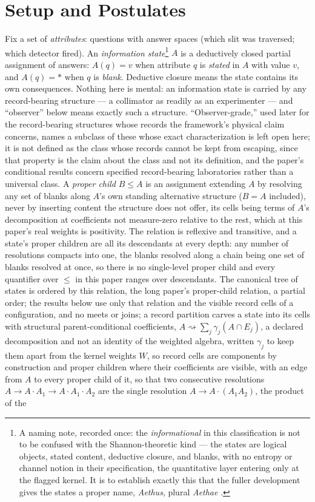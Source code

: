 \section{Setup and Postulates}\label{sec:postulates}

Fix a set of \emph{attributes}: questions with answer spaces (which slit was traversed; which detector fired). An \emph{information state}\footnote{A naming note, recorded once: the \emph{informational} in this classification is not to be confused with the Shannon-theoretic kind --- the states are logical objects, stated content, deductive closure, and blanks, with no entropy or channel notion in their specification, the quantitative layer entering only at the flagged kernel. It is to establish exactly this that the fuller development gives the states a proper name, \emph{Aethus}, plural \emph{Aethae} \cite{Aethus}.} $A$ is a deductively closed partial assignment of answers: $A(q) = v$ when attribute $q$ is \emph{stated} in $A$ with value $v$, and $A(q) = \ast$ when $q$ is \emph{blank}. Deductive closure means the state contains its own consequences. Nothing here is mental: an information state is carried by any record-bearing structure --- a collimator as readily as an experimenter --- and ``observer'' below means exactly such a structure. ``Observer-grade,'' used later for the record-bearing structures whose records the framework's physical claim concerns, names a subclass of these whose exact characterization is left open here; it is not defined as the class whose records cannot be kept from escaping, since that property is the claim about the class and not its definition, and the paper's conditional results concern specified record-bearing laboratories rather than a universal class. A \emph{proper child} $B \le A$ is an assignment extending $A$ by resolving any set of blanks along $A$'s own standing alternative structure ($B = A$ included), never by inserting content the structure does not offer, its cells being terms of $A$'s decomposition at coefficients not measure-zero relative to the rest, which at this paper's real weights is positivity. The relation is reflexive and transitive, and a state's proper children are all its descendants at every depth: any number of resolutions compacts into one, the blanks resolved along a chain being one set of blanks resolved at once, so there is no single-level proper child and every quantifier over $\le$ in this paper ranges over descendants. The canonical tree of states is ordered by this relation, the long paper's proper-child relation, a partial order; the results below use only that relation and the visible record cells of a configuration, and no meets or joins; a record partition carves a state into its cells with structural parent-conditional coefficients, $A \rightsquigarrow \sum_j \gamma_j (A \cap E_j)$, a declared decomposition and not an identity of the weighted algebra, written $\gamma_j$ to keep them apart from the kernel weights $W$, so record cells are components by construction and proper children where their coefficients are visible, with an edge from $A$ to every proper child of it, so that two consecutive resolutions $A \to A \cdot A_1 \to A \cdot A_1 \cdot A_2$ are the single resolution $A \to A \cdot (A_1 A_2)$, the product of the 